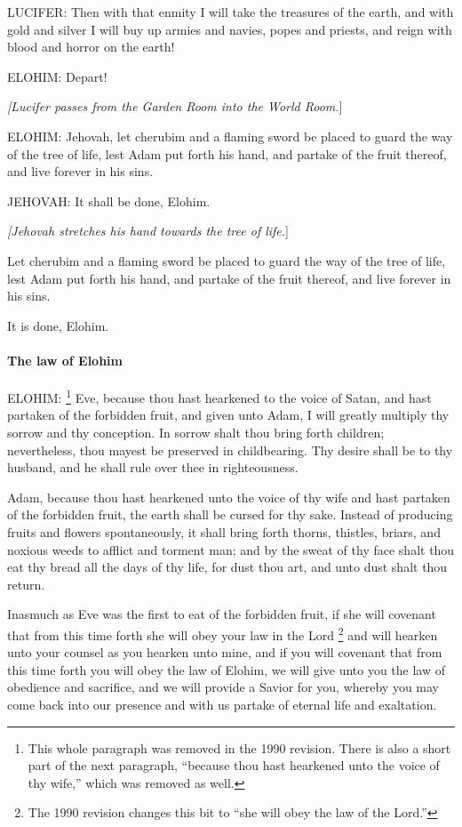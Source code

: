 			LUCIFER: Then with that enmity I will take the treasures of the earth, and with gold and silver I will buy up armies and navies, popes and priests, and reign with blood and horror on the earth!

			ELOHIM: Depart!

			\textit{[Lucifer passes from the Garden Room into the World Room.}]
			
			ELOHIM: Jehovah, let cherubim and a flaming sword be placed to guard the way of the tree of life, lest Adam put forth his hand, and partake of the fruit thereof, and live forever in his sins.

			JEHOVAH: It shall be done, Elohim.

			\textit{[Jehovah stretches his hand towards the tree of life.}]

			Let cherubim and a flaming sword be placed to guard the way of the tree of life, lest Adam put forth his hand, and partake of the fruit thereof, and live forever in his sins.

			It is done, Elohim.
			
			\paragraph{The law of Elohim}
				\label{TEMPLE-ENDOWMENT-ENDOW-PRE-1990-ELOHIM}

				ELOHIM: %
					\footnote{%
						\label{ENDOWMENT-conception}%
						This whole paragraph was removed in the 1990 revision. There is also a short part of the next paragraph, ``because thou hast hearkened unto the voice of thy wife,'' which was removed as well.
						}%
				Eve, because thou hast hearkened to the voice of Satan, and hast partaken of the forbidden fruit, and given unto Adam, I will greatly multiply thy sorrow and thy conception. In sorrow shalt thou bring forth children; nevertheless, thou mayest be preserved in childbearing. Thy desire shall be to thy husband, and he shall rule over thee in righteousness.

				Adam, because thou hast hearkened unto the voice of thy wife and hast partaken of the forbidden fruit, the earth shall be cursed for thy sake. Instead of producing fruits and flowers spontaneously, it shall bring forth thorns, thistles, briars, and noxious weeds to afflict and torment man; and by the sweat of thy face shalt thou eat thy bread all the days of thy life, for dust thou art, and unto dust shalt thou return.

				Inasmuch as Eve was the first to eat of the forbidden fruit, if she will covenant that from this time forth she will obey your law in the Lord%
					\footnote{%
						\label{ENDOWMENT-obey-lord}%
						The 1990 revision changes this bit to ``she will obey the law of the Lord.''
						}
				and will hearken unto your counsel as you hearken unto mine, and if you will covenant that from this time forth you will obey the law of Elohim, we will give unto you the law of obedience and sacrifice, and we will provide a Savior for you, whereby you may come back into our presence and with us partake of eternal life and exaltation.

